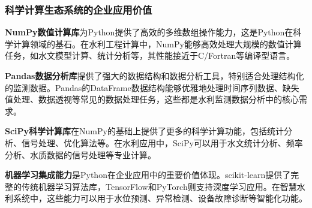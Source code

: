 \begin{Shaded}
\begin{Highlighting}[]
\end{Highlighting}
\end{Shaded}

\subsubsection{科学计算生态系统的企业应用价值}\label{ux79d1ux5b66ux8ba1ux7b97ux751fux6001ux7cfbux7edfux7684ux4f01ux4e1aux5e94ux7528ux4ef7ux503c}

\textbf{NumPy数值计算库}为Python提供了高效的多维数组操作能力，这是Python在科学计算领域的基石。在水利工程计算中，NumPy能够高效处理大规模的数值计算任务，如水文模型计算、统计分析等，其性能接近于C/Fortran等编译型语言。

\textbf{Pandas数据分析库}提供了强大的数据结构和数据分析工具，特别适合处理结构化的监测数据。Pandas的DataFrame数据结构能够优雅地处理时间序列数据、缺失值处理、数据透视等常见的数据处理任务，这些都是水利监测数据分析中的核心需求。

\textbf{SciPy科学计算库}在NumPy的基础上提供了更多的科学计算功能，包括统计分析、信号处理、优化算法等。在水利应用中，SciPy可以用于水文统计分析、频率分析、水质数据的信号处理等专业计算。

\textbf{机器学习集成能力}是Python在企业应用中的重要价值体现。scikit-learn提供了完整的传统机器学习算法库，TensorFlow和PyTorch则支持深度学习应用。在智慧水利系统中，这些能力可以用于水位预测、异常检测、设备故障诊断等智能化功能。

